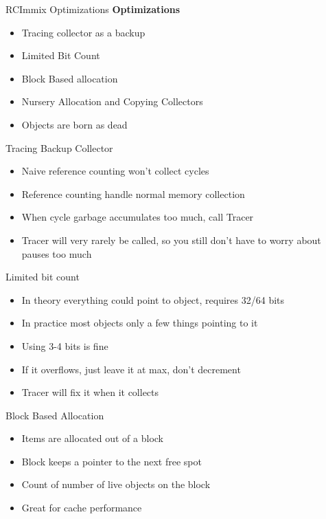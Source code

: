 \documentclass{beamer}
\begin{document}
\begin{frame}{RCImmix Optimizations}
	\textbf{Optimizations}
	\begin{itemize}
		\item Tracing collector as a backup
		\item Limited Bit Count
		\item Block Based allocation
		\item Nursery Allocation and Copying Collectors
		\item Objects are born as dead
	\end{itemize}
\end{frame}

\begin{frame}{Tracing Backup Collector}
	\begin{itemize}
		\item Naive reference counting won't collect cycles
		\item Reference counting handle normal memory collection
		\item When cycle garbage accumulates too much, call Tracer
		\item Tracer will very rarely be called, so you still don't have to worry about pauses too much
	\end{itemize}
\end{frame}

\begin{frame}{Limited bit count}
	\begin{itemize}
		\item In theory everything could point to object, requires 32/64 bits
		\item In practice most objects only a few things pointing to it
		\item Using 3-4 bits is fine
		\item If it overflows, just leave it at max, don't decrement
		\item Tracer will fix it when it collects
	\end{itemize}
\end{frame}

\begin{frame}{Block Based Allocation}
	\begin{itemize}
		\item Items are allocated out of a block
		\item Block keeps a pointer to the next free spot
		\item Count of number of live objects on the block
		\item Great for cache performance
	\end{itemize}
\end{frame}
\end{document}
